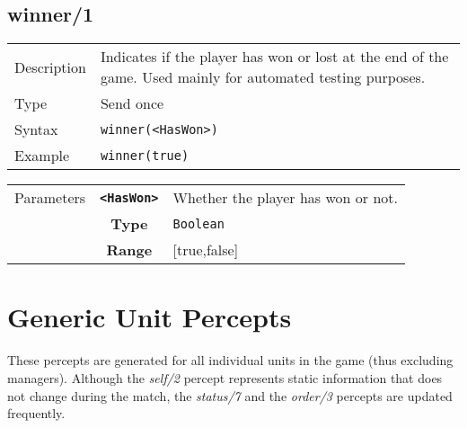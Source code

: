 \subsection{winner/1}
\begin{tabularx}{\textwidth}{lX}
 Description & Indicates if the player has won or lost at the end of the game. Used mainly for automated testing purposes. \\
 Type & Send once \\
 Syntax &  \verb|winner(<HasWon>)| \\
 Example & \verb|winner(true)|   \\
 \end{tabularx}
 \begin{tabularx}{\textwidth}{l | c | p{8cm}|}
 \cline{2-3}
  Parameters & \textbf{\verb|<HasWon>|} & Whether the player has won or not. \\
             & \textbf{Type} & \verb|Boolean| \\
            & \textbf{Range} & [true,false] \\
            \cline{2-3}
 \end{tabularx}
 
\newpage
 
\section{Generic Unit Percepts}
These percepts are generated for all individual units in the game (thus excluding managers). Although the \textit{self/2} percept represents static information that does not change during the match, the \textit{status/7} and the \textit{order/3} percepts are updated frequently.

